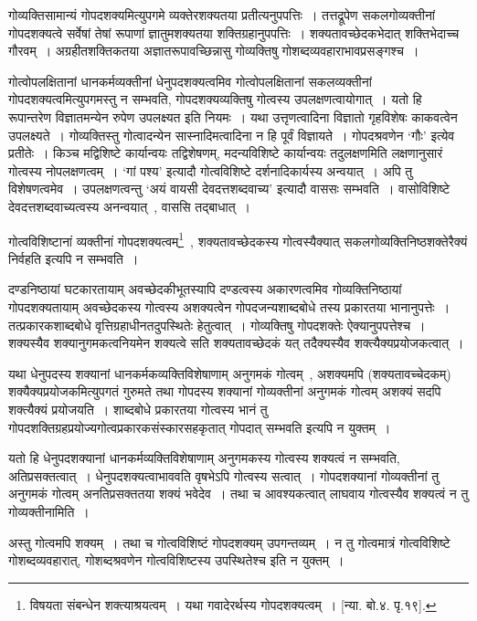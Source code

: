 			गोव्यक्तिसामान्यं गोपदशक्यमित्युपगमे व्यक्तेरशक्यतया प्रतीत्यनुपपत्तिः~। तत्तद्रूपेण सकलगोव्यक्तीनां गोपदशक्यत्वे सर्वेषां तेषां रूपाणां ज्ञातुमशक्यतया शक्तिग्रहानुपपत्तिः~। शक्यतावच्छेदकभेदात् शक्तिभेदाच्च गौरवम्~। अग्रहीतशक्तिकतया अज्ञातरूपावच्छिन्नासु गोव्यक्तिषु गोशब्दव्यवहाराभावप्रसङ्गश्च~।

			गोत्वोपलक्षितानां धानकर्मव्यक्तीनां धेनुपदशक्यत्वमिव गोत्वोपलक्षितानां सकलव्यक्तीनां गोपदशक्यत्वमित्युपगमस्तु न सम्भवति, गोपदशक्यव्यक्तिषु गोत्वस्य उपलक्षणत्वायोगात्~। यतो हि रूपान्तरेण विज्ञातमन्येन रुपेण उपलक्ष्यत इति नियमः~। यथा उत्तृणत्वादिना विज्ञातो गृहविशेषः काकवत्वेन उपलक्ष्यते~। गोव्यक्तिस्तु  गोत्वादन्येन सास्नादिमत्वादिना न हि पूर्वं विज्ञायते~। गोपदश्रवणेन ‘गौः' इत्येव प्रतीतेः~। किञ्च मद्विशिष्टे कार्यान्वयः तद्विशेषणम्, मदन्यविशिष्टे कार्यान्वयः तदुलक्षणमिति लक्षणानुसारं गोत्वस्य नोपलक्षणत्वम्~। ‘गां पश्य' इत्यादौ गोत्वविशिष्टे दर्शनादिकार्यस्य अन्वयात्~। अपि तु विशेषणत्वमेव~। उपलक्षणत्वन्तु ‘अयं वायसी देवदत्तशब्दवाच्य' इत्यादौ वाससः सम्भवति~। वासोविशिष्टे देवदत्तशब्दवाच्यत्वस्य अनन्वयात्~, वाससि तद्बाधात्~। 

			गोत्वविशिष्टानां व्यक्तीनां गोपदशक्यत्वम्\footnote{विषयता संबन्धेन शक्त्याश्रयत्वम्~। यथा गवादेरर्थस्य गोपदशक्यत्वम्~। [न्या. बो.४. पृ.१९].}~, शक्यतावच्छेदकस्य गोत्वस्यैक्यात् सकलगोव्यक्तिनिष्ठशक्तेरैक्यं निर्वहति इत्यपि न सम्भवति~। 

			दण्डनिष्ठायां घटकारतायाम् अवच्छेदकीभूतस्यापि दण्डत्वस्य अकारणत्वमिव गोव्यक्तिनिष्ठायां गोपदशक्यतायाम् अवच्छेदकस्य गोत्वस्य अशक्यत्वेन गोपदजन्यशाब्दबोधे तस्य प्रकारतया भानानुपत्तेः~। तत्प्रकारकशाब्दबोधे वृत्तिग्रहाधीनतदुपस्थितेः हेतुत्वात्~। गोव्यक्तिषु गोपदशक्तेः  ऐक्यानुपपत्तेश्च~। शक्यस्यैव शक्यानुगमकत्वनियमेन शक्यत्वे सति शक्यतावच्छेदकं यत् तदैक्यस्यैव शक्त्यैक्यप्रयोजकत्वात्~। 

			यथा धेनुपदस्य शक्यानां धानकर्मकव्यक्तिविशेषाणाम् अनुगमकं  गोत्वम्~, अशक्यमपि (शक्यतावच्चेदकम्) शक्यैक्यप्रयोजकमित्युपगतं गुरुमते तथा गोपदस्य शक्यानां गोव्यक्तीनां अनुगमकं गोत्वम् अशक्यं सदपि शक्त्यैक्यं प्रयोजयति~। शाब्दबोधे प्रकारतया गोत्वस्य भानं तु गोपदशक्तिग्रहप्रयोज्यगोत्वप्रकारकसंस्कारसहकृतात् गोपदात् सम्भवति इत्यपि न युक्तम्~। 

			यतो हि धेनुपदशक्यानां धानकर्मव्यक्तिविशेषाणाम् अनुगमकस्य गोत्वस्य शक्यत्वं न सम्भवति, अतिप्रसक्तत्वात्~। धेनुपदशक्यत्वाभाववति वृषभेऽपि गोत्वस्य सत्वात्~। गोपदशक्यानां गोव्यक्तीनां तु अनुगमकं गोत्वम् अनतिप्रसक्ततया शक्यं भवेदेव~। तथा च आवश्यकत्वात् लाघवाय गोत्वस्यैव शक्यत्वं न तु गोव्यक्तीनामिति~।

			अस्तु गोत्वमपि शक्यम्~। तथा च गोत्वविशिष्टं गोपदशक्यम् उपगन्तव्यम्~। न तु गोत्वमात्रं गोत्वविशिष्टे गोशब्दव्यवहारात्, गोशब्दश्रवणेन गोत्वविशिष्टस्य उपस्थितेश्च इति न युक्तम्~।

